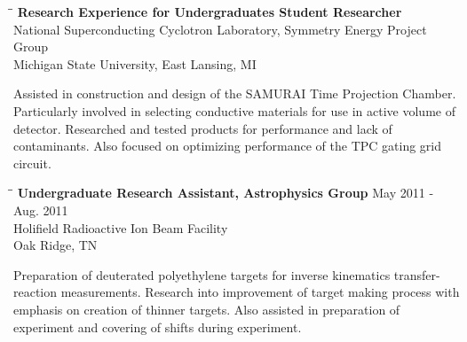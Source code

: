 \documentclass[10pt]{res} %
\begin{document}
\begin{resume}
\begin{tabbing}
\hspace{2.3in}\= \hspace{2.5in}\= \kill %
  \textbf{Research Experience for Undergraduates Student Researcher} \> \\
National Superconducting Cyclotron Laboratory, Symmetry Energy Project Group \\
Michigan State University, East Lansing, MI \\
\end{tabbing}\vspace{-20pt}      %

Assisted in construction and design of the SAMURAI Time Projection Chamber. 
Particularly involved in selecting conductive materials for use in active 
volume of detector. Researched and tested products for performance and lack 
of contaminants. Also focused on optimizing performance of the TPC gating grid circuit.

\begin{tabbing}
\hspace{2.3in}\= \hspace{2.5in}\= \kill %
\textbf{Undergraduate Research Assistant, Astrophysics Group} \>\> May 2011 - Aug. 2011\\
Holifield Radioactive Ion Beam Facility \\
Oak Ridge, TN \\
\end{tabbing}\vspace{-20pt}      %

Preparation of deuterated polyethylene targets for inverse kinematics 
transfer-reaction measurements. Research into improvement of 
target making process with emphasis on creation of thinner targets. 
Also assisted in preparation of experiment and covering of shifts 
during experiment.


\end{resume}
\end{document}
